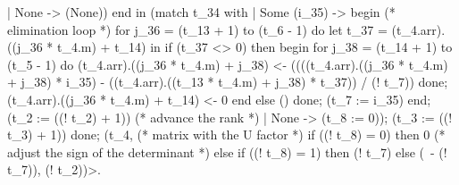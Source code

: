 \documentclass{elsart}
\begin{document}
\begin{code2}
       | None -> (None))
     end in
    (match t_34 with
     | Some (i_35) ->
        begin (* elimination loop *)
         for j_36 = (t_13 + 1) to (t_6 - 1) do
          let t_37 = (t_4.arr).((j_36 * t_4.m) + t_14) in
          if (t_37 <> 0) then begin
           for j_38 = (t_14 + 1) to (t_5 - 1) do
            (t_4.arr).((j_36 * t_4.m) + j_38) <-
             ((((t_4.arr).((j_36 * t_4.m) + j_38) * i_35) -
                ((t_4.arr).((t_13 * t_4.m) + j_38) * t_37)) / (! t_7))
           done;
           (t_4.arr).((j_36 * t_4.m) + t_14) <- 0
          end else ()
         done;
         (t_7 := i_35)
        end;
        (t_2 := ((! t_2) + 1)) (* advance the rank *)
     | None -> (t_8 := 0));
    (t_3 := ((! t_3) + 1))
   done;
   (t_4, (* matrix with the U factor *)
    if ((! t_8) = 0) then 0 (* adjust the sign of the determinant *)
    else if ((! t_8) = 1) then (! t_7)
    else (~- (! t_7)), (! t_2))>.
\end{code2}
\end{document}
